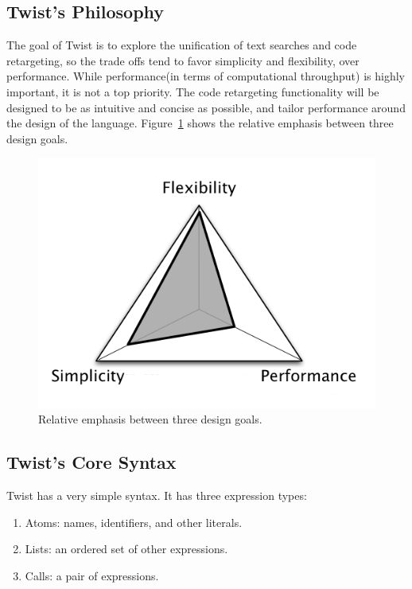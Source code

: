 \subsection{Twist's Philosophy}
\label{sec:philosophy}

The goal of Twist is to explore the unification of text searches and code retargeting, so the trade offs tend to favor simplicity and flexibility, over performance. While performance(in terms of computational throughput) is highly important, it is not a top priority. The code retargeting functionality will be designed to be as intuitive and concise as possible, and tailor performance around the design of the language. Figure~\ref{fig:focalpoints} shows the relative emphasis between three design goals.

\begin{figure}[!ht]
    \centering
    \includegraphics[width=\textwidth]{images/focalpoints}
    \caption{Relative emphasis between three design goals.}
    \label{fig:focalpoints}
\end{figure}

\subsection{Twist's Core Syntax}
\label{sec:syntax}

Twist has a very simple syntax. It has three expression types: 

\begin{enumerate}
	\item Atoms: names, identifiers, and other literals.
	\item Lists: an ordered set of other expressions. 
	\item Calls: a pair of expressions.
\end{enumerate}

